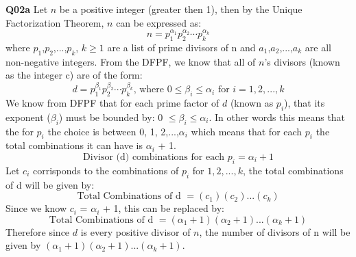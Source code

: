 \documentclass[11pt]{article}
\begin{document}
\textbf{Q02a} Let $n$ be a positive integer (greater then 1), then by the Unique Factorization Theorem, $n$ can be expressed as:
\[  n = p_1^{\alpha_1}p_2^{\alpha_2}\cdots p_k^{\alpha_k} \]
where $p_1$,$p_2$,...,$p_k$, $k\geq1$ are a list of prime divisors of n and $a_1$,$a_2$,...,$a_k$ are all non-negative integers. From the DFPF, we know that all of $n$'s divisors (known as the integer c) are of the form:
\[  d = p_1^{\beta_1}p_2^{\beta_2}\cdots p_k^{\beta_k} \text{, where } 0\leq\beta_i\leq\alpha_i \text{ for  }  i = 1,2,...,k\]
We know from DFPF that for each prime factor of $d$ (known as $p_i$), that its exponent ($\beta_i$) must be bounded by:  0 $\leq \beta_i \leq \alpha_i$. In other words this means that the for $p_i$ the choice is between 0, 1, 2,...,$\alpha_i$ which means that for each $p_i$ the total combinations it can have is $\alpha_i$ + 1. 
\[ \text{Divisor (d) combinations for each  } p_i = \alpha_i + 1 \]
Let  $c_i$ corrisponds to the combinations of $p_i$ for $1,2,...,k$, the total combinations of d will be given by:
\[  \text{Total Combinations of d } = (c_1)(c_2)...(c_k) \]
Since we know $c_i$ = $\alpha_i$ + 1, this can be replaced by:
\[  \text{Total Combinations of d } = (\alpha_1 + 1)(\alpha_2 + 1)...(\alpha_k + 1) \]
Therefore since $d$ is every positive divisor of $n$, the number of divisors of n will be given by $(\alpha_1 + 1)(\alpha_2 + 1)...(\alpha_k + 1)$.
\end{document}
